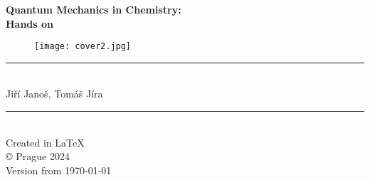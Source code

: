 \begin{titlepage}
\begin{center}
\vspace*{2cm}
{\Huge \textbf{Quantum Mechanics in Chemistry:\\Hands on}}

\bigskip

\begin{figure} [H]
\centering
\texttt{[image: cover2.jpg]}
\end{figure}
\rule{0.8\textwidth}{0.02cm}\\

Jiří Janoš, Tomáš Jíra\\

\end{center}
\vfill
\begin{flushright}
\rule{3cm}{0.01cm} \\
Created in \LaTeX \\
\copyright \hspace{0.1cm} Prague 2024 \\
Version from \today
\end{flushright}
\end{titlepage}
